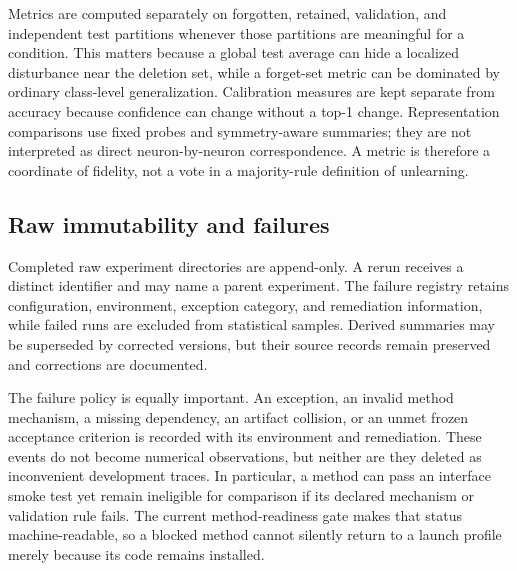 Metrics are computed separately on forgotten, retained, validation, and independent test
partitions whenever those partitions are meaningful for a condition. This matters because a
global test average can hide a localized disturbance near the deletion set, while a forget-set
metric can be dominated by ordinary class-level generalization. Calibration measures are kept
separate from accuracy because confidence can change without a top-1 change. Representation
comparisons use fixed probes and symmetry-aware summaries; they are not interpreted as direct
neuron-by-neuron correspondence. A metric is therefore a coordinate of fidelity, not a vote in
a majority-rule definition of unlearning.

\subsection{Raw immutability and failures}
Completed raw experiment directories are append-only. A rerun receives a distinct
identifier and may name a parent experiment. The failure registry retains configuration,
environment, exception category, and remediation information, while failed runs are
excluded from statistical samples. Derived summaries may be superseded by corrected
versions, but their source records remain preserved and corrections are documented.

The failure policy is equally important. An exception, an invalid method mechanism, a missing
dependency, an artifact collision, or an unmet frozen acceptance criterion is recorded with its
environment and remediation. These events do not become numerical observations, but neither are
they deleted as inconvenient development traces. In particular, a method can pass an interface
smoke test yet remain ineligible for comparison if its declared mechanism or validation rule
fails. The current method-readiness gate makes that status machine-readable, so a blocked method
cannot silently return to a launch profile merely because its code remains installed.
